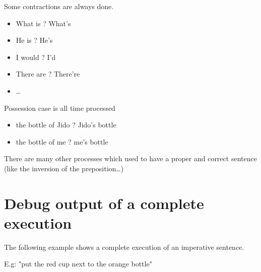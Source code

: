 \documentclass[twoside,a4paper,10pt]{report}
\newcommand{\dokutitlelevelone}[1]{} %
\newcommand{\dokutitleleveltree}[1]{\section{#1}}
\newcommand{\dokuitem}{\item}
\begin{document}
Some contractions are always done.


\begin{itemize}
\dokuitem  What is ? What's
\dokuitem  He is ? He's
\dokuitem  I would ? I'd
\dokuitem  There are ? There're
\dokuitem  \ldots{}
\end{itemize}

Possession case is all time processed


\begin{itemize}
\dokuitem  the bottle of Jido ? Jido's bottle
\dokuitem  the bottle of me ? me's bottle
\end{itemize}

There are many other processes which used to have a proper and correct sentence (like the inversion of the preposition\ldots{}) 


\dokutitlelevelone{Examples}
\label{bfebe34154a0dfd9fc7b447fc9ed74e9}%

\dokutitleleveltree{Debug output of a complete execution}
\label{0097f2f6e11fc0ff7741d98d8bff8634}%

The following example shows a complete execution of an imperative sentence.

E.g: "put the red cup next to the orange bottle"
\end{document}
